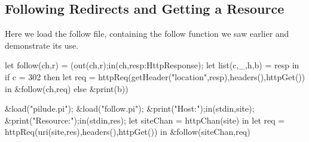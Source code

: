 \subsection{Following Redirects and Getting a Resource}

Here we load the follow file, containing the follow function we saw earlier and demonstrate its use.

\begin{code}
let follow(ch,r) = (out(ch,r);in(ch,resp:HttpResponse);
    let list(c,_,h,b) = resp in
        if c = 302 
            then let req = httpReq(getHeader("location",resp),headers(),httpGet()) in &follow(ch,req) 
            else &print(b)) 
\end{code}
\begin{code}
&load("pilude.pi");
&load("follow.pi");
&print("Host:");in(stdin,site);
&print("Resource:");in(stdin,res);
let siteChan = httpChan(site) in
    let req = httpReq(uri(site,res),headers(),httpGet()) in &follow(siteChan,req)
\end{code}
